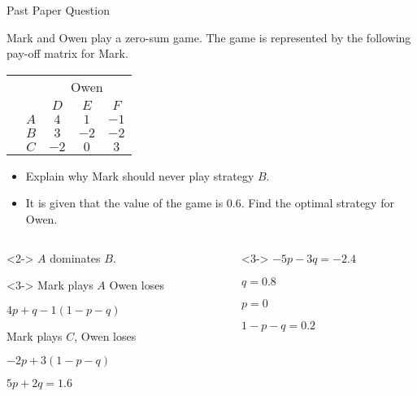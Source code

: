 \documentclass[8pt]{beamer}
\begin{document}
\begin{frame}{Past Paper Question}
	\begin{problem}
		Mark and Owen play a zero-sum game. The game is represented by the following pay-off matrix for Mark.

			\begin{center}	
			\colorbox{cc}{
  \setlength\arrayrulewidth{0.5mm}
	\begin{tabular}{cc|ccc}
\multicolumn{2}{c}{} & \multicolumn{3}{c}{Owen}\\
\multicolumn{1}{c}{} &  & $D$  & $E$ & $ F$ \\ \hline 
\raisebox{0cm}{\multirow{3}*{\rotatebox{90}{Mark}}}  & $A$ & $4$ & $1$ & $-1$ \\
						     & $B$ & $3$ & $-2$ & $-2$ \\
						     & $C$ & $-2$ & $0$ & $3$ \\
\end{tabular}}
\end{center}
\begin{itemize}
	\item Explain why Mark should never play strategy $B.$
	\item It is given that the value of the game is 0.6. Find the optimal strategy for Owen.
\end{itemize}
	\end{problem}

	\begin{columns}[T]
	\begin{column}{.5\linewidth}
	\begin{solution}<2->
		$A$ dominates  $B$.
	\end{solution}
	\begin{solution}<3->
		Mark plays $A$ Owen loses

		$4p+q-1(1-p-q)$

		Mark plays  $C$, Owen loses

		$-2p+3(1-p-q)$

		 $5p+2q=1.6$
	\end{solution}
	\end{column}
	\begin{column}{.5\linewidth}
	\begin{solution}<3->
		$-5p-3q=-2.4$

		 $q=0.8$

		  $p=0$

		   $1-p-q=0.2$
	\end{solution}
	\end{column}
	\end{columns}
\end{frame}
\end{document}
